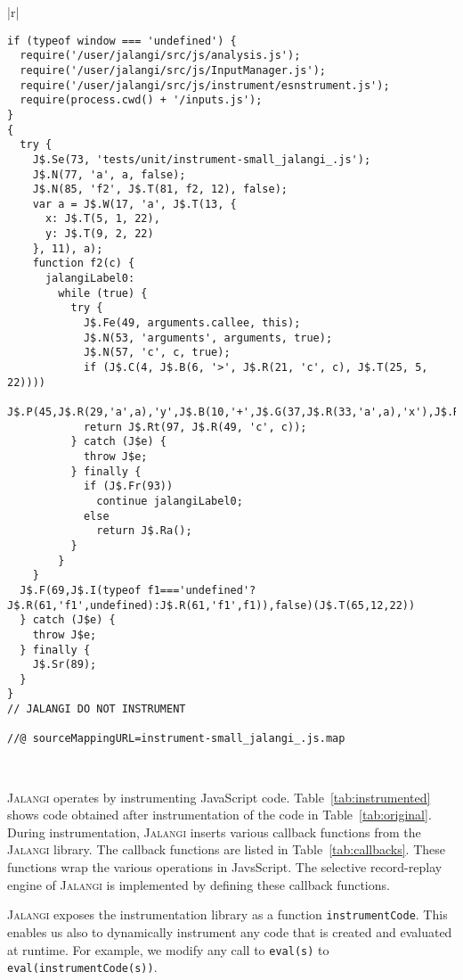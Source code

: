 \documentclass{sig-alternate}
\def\jalangi{\textsc{Jalangi}}
\begin{document}
\begin{table*}
\caption{After Instrumentation of  Code in Table~\ref{tab:original}}
\label{tab:instrumented}
\begin{tabular}{|r|}
\hline\\
{\scriptsize
\begin{lstlisting}
if (typeof window === 'undefined') {
  require('/user/jalangi/src/js/analysis.js');
  require('/user/jalangi/src/js/InputManager.js');
  require('/user/jalangi/src/js/instrument/esnstrument.js');
  require(process.cwd() + '/inputs.js');
}
{
  try {
    J$.Se(73, 'tests/unit/instrument-small_jalangi_.js');
    J$.N(77, 'a', a, false);
    J$.N(85, 'f2', J$.T(81, f2, 12), false);
    var a = J$.W(17, 'a', J$.T(13, {
      x: J$.T(5, 1, 22),
      y: J$.T(9, 2, 22)
    }, 11), a);
    function f2(c) {
      jalangiLabel0:
        while (true) {
          try {
            J$.Fe(49, arguments.callee, this);
            J$.N(53, 'arguments', arguments, true);
            J$.N(57, 'c', c, true);
            if (J$.C(4, J$.B(6, '>', J$.R(21, 'c', c), J$.T(25, 5, 22))))
              J$.P(45,J$.R(29,'a',a),'y',J$.B(10,'+',J$.G(37,J$.R(33,'a',a),'x'),J$.R(41,'c',c)));
            return J$.Rt(97, J$.R(49, 'c', c));
          } catch (J$e) {
            throw J$e;
          } finally {
            if (J$.Fr(93))
              continue jalangiLabel0;
            else
              return J$.Ra();
          }
        }
    }
  J$.F(69,J$.I(typeof f1==='undefined'?J$.R(61,'f1',undefined):J$.R(61,'f1',f1)),false)(J$.T(65,12,22))
  } catch (J$e) {
    throw J$e;
  } finally {
    J$.Sr(89);
  }
}
// JALANGI DO NOT INSTRUMENT

//@ sourceMappingURL=instrument-small_jalangi_.js.map
\end{lstlisting}
}\\
\hline
\end{tabular}
\end{table*}

\jalangi{} operates by instrumenting JavaScript code.
Table~\ref{tab:instrumented} shows code obtained after instrumentation
of the code in Table~\ref{tab:original}.  During instrumentation,
\jalangi{} inserts various callback functions from the \jalangi{}
library.  The callback functions are listed in
Table~\ref{tab:callbacks}.  These functions wrap the various
operations in JavsScript.  The selective record-replay engine of
\jalangi{} is implemented by defining these callback functions.

\jalangi{} exposes the instrumentation library as a function
\texttt{instrumentCode}.  This enables us also to dynamically
instrument any code that is created and evaluated at runtime.  For
example, we modify any call to \texttt{eval(s)} to
\texttt{eval(instrumentCode(s))}.  
\end{document}
